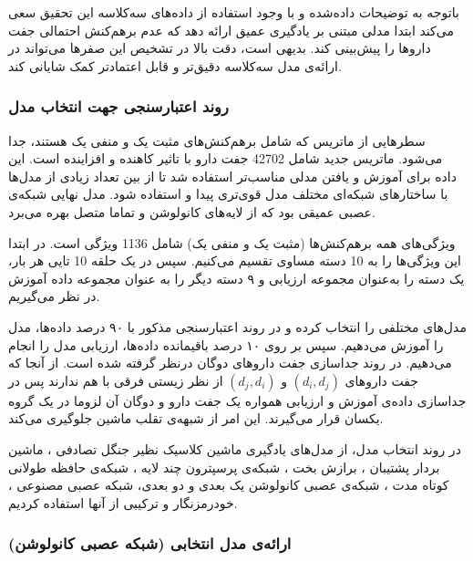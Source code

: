 باتوجه به توضیحات داده‌شده و با وجود استفاده از داده‌های سه‌کلاسه این تحقیق سعی می‌کند ابتدا مدلی مبتنی بر یادگیری عمیق ارائه دهد که عدم برهم‌کنش احتمالی جفت داروها را پیش‌بینی کند. بدیهی است، دقت بالا در تشخیص این صفرها می‌تواند در ارائه‌ی مدل سه‌کلاسه دقیق‌تر و قابل اعتمادتر کمک شایانی کند.

\subsubsection{روند اعتبارسنجی جهت انتخاب مدل
\label{Model_selection_CV}}
سطرهایی از ماتریس
که شامل برهم‌کنش‌‌‌های مثبت یک و منفی یک هستند، جدا می‌شود. ماتریس جدید شامل 42702 جفت دارو با تاثیر کاهنده و افزاینده است. این داده برای آموزش و یافتن مدلی مناسب‌تر استفاده شد تا از بین تعداد زیادی از مدل‌ها با ساختارهای شبکه‌ای مختلف مدل قوی‌تری پیدا و استفاده شود. مدل نهایی شبکه‌ی عصبی عمیقی بود که از لایه‌های کانولوشن و تماما متصل بهره می‌برد.

ویژگی‌های همه برهم‌کنش‌ها (مثبت یک و منفی یک) شامل 1136 ویژگی است. در ابتدا این ویژگی‌ها را به 10 دسته مساوی تقسیم می‌کنیم. سپس در یک حلقه 10 تایی هر بار، یک دسته را به‌عنوان مجموعه ارزیابی و ۹ دسته دیگر را به عنوان مجموعه ‌داده آموزش در نظر می‌گیریم.

مدل‌های مختلفی را انتخاب کرده و در روند اعتبارسنجی مذکور با ۹۰ درصد داده‌ها، مدل را آموزش می‌دهیم. سپس بر روی ۱۰ درصد باقیمانده داده‌ها، ارزیابی مدل را انجام می‌دهیم. در روند جداسازی جفت داروهای دوگان درنظر گرفته شده است. از آنجا که جفت داروهای
$(d_i, d_j)$
و
$(d_j, d_i)$
از نظر زیستی فرقی با هم ندارند پس در جداسازی داده‌ی آموزش و ارزیابی همواره یک جفت دارو و دوگان آن لزوما در یک گروه یکسان قرار می‌گیرند. این امر از شبهه‌ی تقلب ماشین جلوگیری می‌کند.
 
در روند انتخاب مدل، از مدل‌های یادگیری ماشین کلاسیک نظیر جنگل تصادفی
،
ماشین بردار پشتیبان
، 
برازش بخت
،
شبکه‌ی پرسپترون چند لایه
،
شبکه‌ی حافظه طولانی کوتاه مدت
، 
شبکه‌ی عصبی ‌کانولوشن یک بعدی و دو بعدی، شبکه عصبی مصنوعی
،
خودرمزنگار و ترکیبی از آنها استفاده کردیم.


 \subsubsection{ارائه‌ی مدل انتخابی (شبکه عصبی کانولوشن)
 \label{selected_model}}

